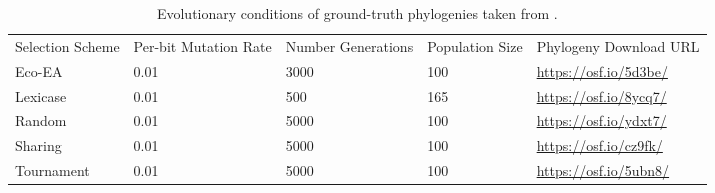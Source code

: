 \begin{sidewaystable}[]
\begin{tabular}{lllll}
Selection Scheme & Per-bit Mutation Rate & Number Generations & Population Size & Phylogeny Download URL \\
Eco-EA           & 0.01                  & 3000               & 100             & \url{https://osf.io/5d3be/} \\
Lexicase         & 0.01                  & 500                & 165             & \url{https://osf.io/8ycq7/} \\
Random           & 0.01                  & 5000               & 100             & \url{https://osf.io/ydxt7/} \\
Sharing          & 0.01                  & 5000               & 100             & \url{https://osf.io/cz9fk/} \\
Tournament       & 0.01                  & 5000               & 100             & \url{https://osf.io/5ubn8/}
\end{tabular}
\caption{
Evolutionary conditions of ground-truth phylogenies taken from \citep{dolson2018applying}.
} \label{tab:ground-truth-phylogenies}
\end{sidewaystable}
